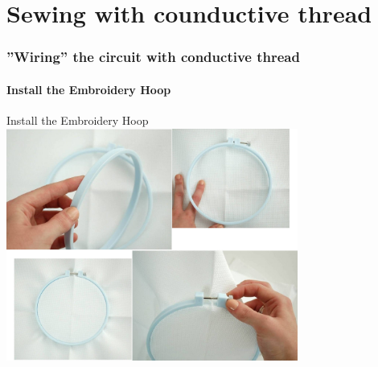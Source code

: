\documentclass{beamer}
\begin{document}
\part{Sewing with counductive thread}
\section{''Wiring'' the circuit with conductive thread}
\frame{\tableofcontents[hideothersubsections,sectionstyle=show/hide]}
\subsection{Install the Embroidery Hoop}
\begin{frame}[fragile]{Install the Embroidery Hoop}
\includegraphics[height=3in]{InstallEmbroideryHoop.jpg}
\end{frame} 
\end{document}
